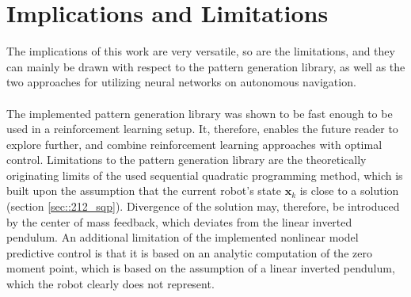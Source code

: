 \section{Implications and Limitations}
The implications of this work are very versatile, so are the limitations, and they can mainly be drawn with respect to the pattern generation library, as well as the two approaches for utilizing neural networks on autonomous navigation.\\\\
The implemented pattern generation library was shown to be fast enough to be used in a reinforcement learning setup. It, therefore, enables the future reader to explore further, and combine reinforcement learning approaches with optimal control. Limitations to the pattern generation library are the theoretically originating limits of the used sequential quadratic programming method, which is built upon the assumption that the current robot's state $\bm{x}_k$ is close to a solution (section \ref{sec::212_sqp}). Divergence of the solution may, therefore, be introduced by the center of mass feedback, which deviates from the linear inverted pendulum. An additional limitation of the implemented nonlinear model predictive control is that it is based on an analytic computation of the zero moment point, which is based on the assumption of a linear inverted pendulum, which the robot clearly does not represent.\\\\
